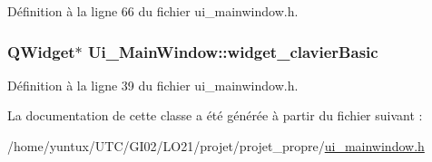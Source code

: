 \-Définition à la ligne 66 du fichier ui\-\_\-mainwindow.\-h.

\hypertarget{class_ui___main_window_a4684b35f7b6ce7e3b2372b2b01037ea2}{
\subsubsection[{widget\-\_\-clavier\-Basic}]{\setlength{\rightskip}{0pt plus 5cm}\-Q\-Widget$\ast$ {\bf \-Ui\-\_\-\-Main\-Window\-::widget\-\_\-clavier\-Basic}}}\label{class_ui___main_window_a4684b35f7b6ce7e3b2372b2b01037ea2}


\-Définition à la ligne 39 du fichier ui\-\_\-mainwindow.\-h.



\-La documentation de cette classe a été générée à partir du fichier suivant \-:\begin{DoxyCompactItemize}
\item 
/home/yuntux/\-U\-T\-C/\-G\-I02/\-L\-O21/projet/projet\-\_\-propre/\hyperlink{ui__mainwindow_8h}{ui\-\_\-mainwindow.\-h}\end{DoxyCompactItemize}
